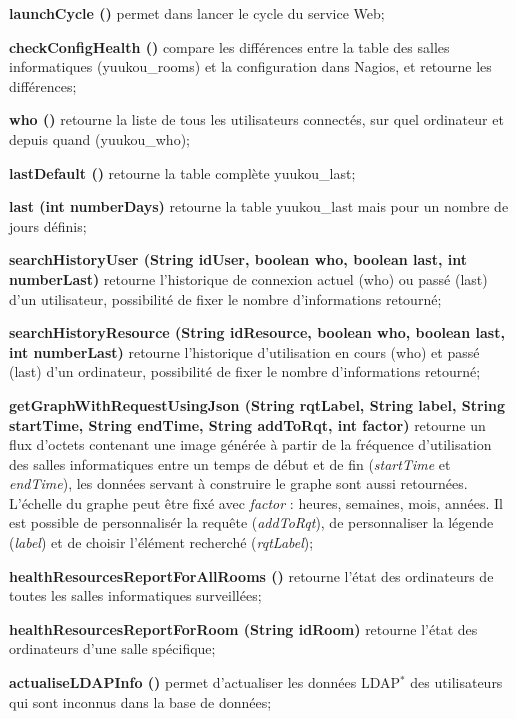 \begin{longdescription}
	\item[\textbf{launchCycle ()}] permet dans lancer le cycle du service Web;
	\item[\textbf{checkConfigHealth ()}] compare les diff\'erences entre la table des salles informatiques (\textsf{yuukou\_rooms}) et la configuration dans Nagios, et retourne les diff\'erences;
	\item[\textbf{who ()}] retourne la liste de tous les utilisateurs connect\'es, sur quel ordinateur et depuis quand (\textsf{yuukou\_who});
	\item[\textbf{lastDefault ()}] retourne la table compl\`ete \textsf{yuukou\_last};
	\item[\textbf{last (int numberDays)}] retourne la table \textsf{yuukou\_last} mais pour un nombre de jours d\'efinis;
	\item[\textbf{searchHistoryUser (String idUser, boolean who, boolean last, int numberLast)}] retourne l'historique de connexion actuel (who) ou pass\'e (last) d'un utilisateur, possibilit\'e de fixer le nombre d'informations retourn\'e;
	\item[\textbf{searchHistoryResource (String idResource, boolean who, boolean last, int numberLast)}] retourne l'historique d'utilisation en cours (who) et pass\'e (last) d'un ordinateur, possibilit\'e de fixer le nombre d'informations retourn\'e;
	\item[\textbf{getGraphWithRequestUsingJson (String rqtLabel, String label, String startTime, String endTime, String addToRqt, int factor)}] retourne un flux d'octets contenant une image g\'en\'er\'ee \`a partir de la fr\'equence d'utilisation des salles informatiques entre un temps de d\'ebut et de fin (\textit{startTime} et \textit{endTime}), les donn\'ees servant \`a construire le graphe sont aussi retourn\'ees. L'\'echelle du graphe peut \^etre fix\'e avec \textit{factor} : heures, semaines, mois, ann\'ees.
Il est possible de personnalis\'er la requ\^ete (\textit{addToRqt}), de personnaliser la l\'egende (\textit{label}) et de choisir l'\'el\'ement recherch\'e (\textit{rqtLabel});
	\item[\textbf{healthResourcesReportForAllRooms ()}] retourne l'\'etat des ordinateurs de toutes les salles informatiques surveill\'ees;
	\item[\textbf{healthResourcesReportForRoom (String idRoom)}] retourne l'\'etat des ordinateurs d'une salle sp\'ecifique;
	\item[\textbf{actualiseLDAPInfo ()}] permet d'actualiser les donn\'ees LDAP$^*$ des utilisateurs qui sont inconnus dans la base de donn\'ees;

\end{longdescription}
